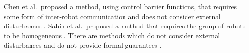 
Chen et al.\ proposed a method, using control barrier functions, that requires some form of inter-robot 
communication and does not consider external disturbances \cite{Chen2018cbf}.
Sahin et al.\ proposed a method that requires the group of robots to be homogeneous \cite{Shahin2017cltl}.
There are methods which do not consider external disturbances and do not provide formal guarantees \cite{jackson2020scalable}.


